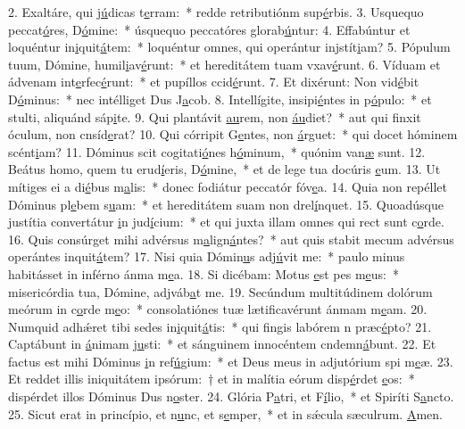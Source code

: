 2. Exaltáre, qui j\uline{ú}dicas t\uline{e}rram:~* redde retributiónm sup\uline{é}rbis.
3. Usquequo peccat\uline{ó}res, D\uline{ó}mine:~* úsquequo peccatóres glorab\uline{ú}ntur:
4. Effabúntur et loquéntur in\uline{i}quit\uline{á}tem:~* loquéntur omnes, qui operántur injstít\uline{i}am?
5. Pópulum tuum, Dómine, humil\uline{i}av\uline{é}runt:~* et hereditátem tuam vxav\uline{é}runt.
6. Víduam et ádvenam int\uline{e}rfec\uline{é}runt:~* et pupíllos ccid\uline{é}runt.
7. Et dixérunt: Non vid\uline{é}bit D\uline{ó}minus:~* nec intélliget Dus J\uline{a}cob.
8. Intellígite, insipi\uline{é}ntes in p\uline{ó}pulo:~* et stulti, aliquánd sáp\uline{i}te.
9. Qui plantávit \uline{au}rem, non \uline{áu}diet?~* aut qui finxit óculum, non cnsíd\uline{e}rat?
10. Qui córripit G\uline{e}ntes, non \uline{á}rguet:~* qui docet hóminem scént\uline{i}am?
11. Dóminus scit cogitati\uline{ó}nes h\uline{ó}minum,~* quónim van\uline{æ} sunt.
12. Beátus homo, quem tu erud\uline{í}eris, D\uline{ó}mine,~* et de lege tua docúris \uline{e}um.
13. Ut mítiges ei a di\uline{é}bus m\uline{a}lis:~* donec fodiátur peccatór fóv\uline{e}a.
14. Quia non repéllet Dóminus pl\uline{e}bem s\uline{u}am:~* et hereditátem suam non drel\uline{í}nquet.
15. Quoadúsque justítia convertátur \uline{i}n jud\uline{í}cium:~* et qui juxta illam omnes qui rect sunt c\uline{o}rde.
16. Quis consúrget mihi advérsus m\uline{a}lign\uline{á}ntes?~* aut quis stabit mecum advérsus operántes inquit\uline{á}tem?
17. Nisi quia Dómin\uline{u}s adj\uline{ú}vit me:~* paulo minus habitásset in inférno ánma m\uline{e}a.
18. Si dicébam: Motus \uline{e}st pes m\uline{e}us:~* misericórdia tua, Dómine, adjváb\uline{a}t me.
19. Secúndum multitúdinem dolórum meórum in c\uline{o}rde m\uline{e}o:~* consolatiónes tuæ lætificavérunt ánmam m\uline{e}am.
20. Numquid adhǽret tibi sedes in\uline{i}quit\uline{á}tis:~* qui fingis labórem n præc\uline{é}pto?
21. Captábunt in \uline{á}nimam j\uline{u}sti:~* et sánguinem innocéntem cndemn\uline{á}bunt.
22. Et factus est mihi Dóminus \uline{i}n ref\uline{ú}gium:~* et Deus meus in adjutórium spi m\uline{e}æ.
23. Et reddet illis iniquitátem ipsórum:~† et in malítia eórum disp\uline{é}rdet \uline{e}os:~* dispérdet illos Dóminus Dus n\uline{o}ster.
24. Glória P\uline{a}tri, et F\uline{í}lio,~* et Spiríti S\uline{a}ncto.
25. Sicut erat in princípio, et n\uline{u}nc, et s\uline{e}mper,~* et in sǽcula sæculrum. \uline{A}men.
